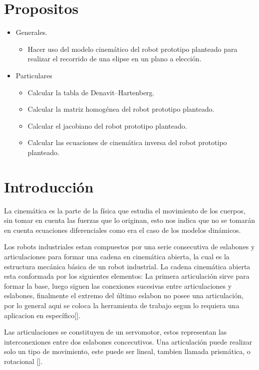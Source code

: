 \documentclass[12pt]{article}
\begin{document}
\section{Propositos}
\begin{itemize}
    \item Generales.
    \begin{itemize}
        \item Hacer uso del modelo cinemático del robot prototipo planteado para realizar el recorrido de una elipse en un plano a elección. 
    \end{itemize}
    \item Particulares
    \begin{itemize}
        \item Calcular la tabla de Denavit–Hartenberg.
        \item Calcular la matriz homogénea del robot prototipo planteado.
        \item Calcular el jacobiano del robot prototipo planteado.
        \item Calcular las ecuaciones de cinemática inversa del robot prototipo planteado.
    \end{itemize}
\end{itemize}
\newpage
\section{Introducción}
La cinemática es la parte de la física que estudia el movimiento de los cuerpos, sin tomar en cuenta las fuerzas que lo originan, esto nos indica que no se tomarán en cuenta ecuaciones diferenciales como era el caso de los modelos dinámicos.
\vspace{6mm}

Los robots industriales estan compuestos por una serie consecutiva de eslabones y articulaciones para formar una cadena en cinemática abierta, la cual es la estructura mecánica básica de un robot industrial. La cadena cinemática abierta esta conformada por los siguientes elementos: La primera articulación sirve para formar la base, luego siguen las conexiones sucesivas entre articulaciones y eslabones, finalmente el extremo del último eslabon no posee una articulación, por lo general aqui se coloca la herramienta de trabajo segun lo requiera una aplicacion en específico[\cite{reyes2011robotica}].
\vspace{6mm}

Las articulaciones se constituyen de un servomotor, estos representan las interconexiones entre dos eslabones concecutivos. Una articulación puede realizar solo un tipo de movimiento, este puede ser lineal, tambien llamada prismática, o rotacional [\cite{reyes2011robotica}].
\vspace{6mm}
\end{document}
